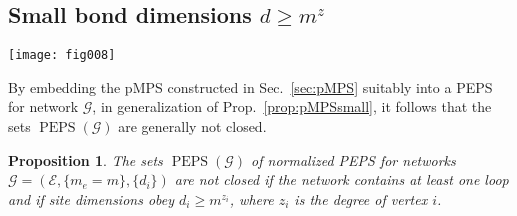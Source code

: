 \documentclass[english,11pt,aps,pra,onecolumn,tightenlines,groupedaddress,superscriptaddress,notitlepage,floatfix,fleqn]{revtex4-1}
\newcommand{\ket}{\rangle}
\newcommand{\hA}{\hat{A}}
\newcommand{\mc}[1]{\mathcal{#1}}
\renewcommand{\H}{\mc{H}}
\newcommand{\E}{\mc{E}}
\newcommand{\G}{\mc{G}}
\newcommand{\PEPS}{\operatorname{PEPS}}
\newtheorem{prop}{Proposition}
\begin{document}
\subsection{Small bond dimensions \texorpdfstring{$d\geq m^z$}{d>=m**z}}\label{sec:PEPSsmall}
\begin{figure*}[t]
\label{fig:PEPSsmall}
\texttt{[image: fig008]}
\caption{(a) A PEPS $|\Psi\ket$ can be constructed by starting from the tensor product $|\mu\ket$ of maximally entangled bond states $\sum_{n=1}^{m_e}|n,n\ket_e$, and applying, subsequently, operators $\hA_i$ on each site that map into the site Hilbert spaces $\H_i$; cf.~Eq.~\eqref{eq:PEPSmuDef}. In the diagrams, physical indices are either indicated by encircled numbers or by encircled dots.
(b) Proposition~\ref{prop:PEPSsmall} establishes the non-closedness of PEPS sets for the case where, at each vertex, the local Hilbert space dimension is equal to or larger than the product of bond dimensions, i.e.,  $d_i\geq m^{z_i}$. It is based on PEPS $|\psi_T\ket$, where the tensors of the pMPS $|\psi_\tau\ket$ [Eq.~\eqref{eq:psiTau}] are applied to $|\mu\ket$ along some loop of the network. Here, we chose the loop $(6,7,8,12,11,10)$.
}
\end{figure*}
By embedding the pMPS constructed in Sec.~\eqref{sec:pMPS} suitably into a PEPS for network $\G$, in generalization of Prop.~\ref{prop:pMPSsmall}, it follows that the sets $\PEPS(\G)$ are generally not closed.
\begin{prop}\label{prop:PEPSsmall}
The sets $\PEPS(\G)$ of normalized PEPS for networks $\G=(\E,\{m_e=m\},\{d_i\})$ are not closed if the network contains at least one loop and if site dimensions obey $d_i\geq m^{z_i}$, where $z_i$ is the degree of vertex $i$.
\end{prop}
\end{document}
